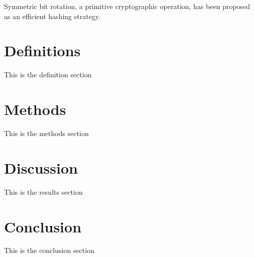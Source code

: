 \documentclass{article}
\begin{document}
Symmetric bit rotation, a primitive cryptographic operation, has been proposed as an efficient hashing strategy\citep{pieprzyk1999fast}.


\section{Definitions}

This is the definition section

\section{Methods}

This is the methods section

\section{Discussion}

This is the results section



\section{Conclusion}
This is the conclusion section



\end{document}
